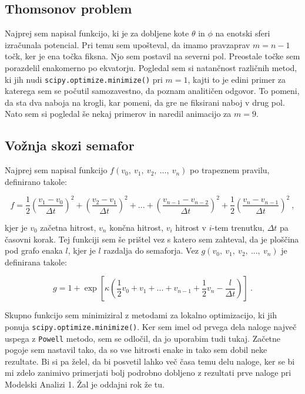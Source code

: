 \documentclass[a4paper]{article}
\begin{document}
\subsection{Thomsonov problem}
Najprej sem napisal funkcijo, ki je za dobljene kote $\theta$ in $\phi$ na enotski sferi izračunala
potencial. Pri temu sem upošteval, da imamo pravzaprav $m = n - 1$ točk, ker je ena točka fiksna. Njo
sem postavil na severni pol. Preostale točke sem porazdelil enakomerno po ekvatorju. Pogledal sem si
natančnost različnih metod, ki jih nudi \texttt{scipy.optimize.minimize()} pri $m=1$, kajti to je edini
primer za katerega sem se počutil samozavestno, da poznam analitičen odgovor. To pomeni, da sta dva naboja 
na krogli, kar pomeni, da gre ne fiksirani naboj v drug pol. Nato sem si pogledal še nekaj primerov 
in naredil animacijo za $m=9$. \\

\subsection{Vožnja skozi semafor}
Najprej sem napisal funkcijo $f(v_0,\>v_1,\>v_2,\>...,\>v_n)$ po trapeznem pravilu, definirano takole:

\begin{equation}
        f =
        \frac{1}{2} \left(\frac{v_1 - v_0}{\Delta t}\right)^2 + \left(\frac{v_2 - v_1}{\Delta t}\right)^2
        + ... + \left(\frac{v_{n-1} - v_{n-2}}{\Delta t}\right)^2 + \frac{1}{2} \left(\frac{v_n - v_{n-1}}{\Delta t}\right)^2\>,    
\end{equation}

kjer je $v_0$ začetna hitrost, $v_n$ končna hitrost, $v_i$ hitrost v $i$-tem trenutku, $\Delta t$ pa časovni korak.
Tej funkciji sem še prištel vez s katero sem zahteval, da je ploščina pod grafo enaka $l$, kjer je $l$ razdalja 
do semaforja. Vez $g(v_0,\>v_1,\>v_2,\>...,\>v_n)$ je definirana takole:

\begin{equation}
    g = 1 + \exp\left[\kappa\left(\frac{1}{2}v_0 + v_1 + ... + v_{n-1} + \frac{1}{2}v_n - 
    \frac{l}{\Delta t}\right)\right]\>.
\end{equation}

Skupno funkcijo sem minimiziral z metodami za lokalno optimizacijo, ki jih ponuja \texttt{scipy.optimize.minimize()}.
Ker sem imel od prvega dela naloge največ uspega z \texttt{Powell} metodo, sem se odločil, da jo uporabim tudi tukaj.
Začetne pogoje sem nastavil tako, da so vse hitrosti enake in tako sem dobil neke rezultate. Bi si pa želel, da bi 
posvetil lahko več časa temu delu naloge, ker se bi mi zdelo zanimivo primerjati bolj podrobno dobljeno z rezultati
prve naloge pri Modelski Analizi 1. Žal je oddajni rok že tu. \\
\end{document}
